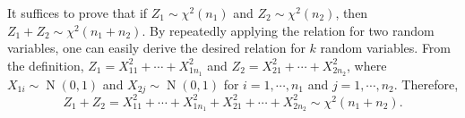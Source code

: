 \documentclass{huhtakm-template-book-v2}
\DeclareMathOperator{\N}{N}
\begin{document}
    \begin{proofing}
        It suffices to prove that if $Z_{1} \sim \chi^{2}(n_{1})$ and $Z_{2} \sim \chi^{2}(n_{2})$, then $Z_{1} + Z_{2} \sim \chi^{2}(n_{1} + n_{2})$. By repeatedly applying the relation for two random variables, one can easily derive the desired relation for $k$ random variables.
        From the definition, $Z_{1} = X_{11}^{2} + \cdots + X_{1n_{1}}^{2}$ and $Z_{2} = X_{21}^{2} + \cdots + X_{2n_{2}}^{2}$, where $X_{1i} \sim \N(0, 1)$ and $X_{2j} \sim \N(0, 1)$ for $i = 1, \cdots, n_{1}$ and $j = 1, \cdots, n_{2}$. Therefore,
        \begin{equation*}
            Z_{1} + Z_{2} = X_{11}^{2} + \cdots + X_{1n_{1}}^{2} + X_{21}^{2} + \cdots + X_{2n_{2}}^{2} \sim \chi^{2}(n_{1} + n_{2}).
        \end{equation*}
    \end{proofing}
	\newpage
\end{document}
